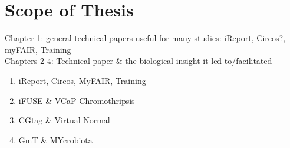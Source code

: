 \chapter*{Scope of Thesis}

Chapter 1: general technical papers useful for many studies: iReport, Circos?, myFAIR, Training \\
Chapters 2-4: Technical paper \& the biological insight it led to/facilitated \\

\begin{enumerate}
    \item iReport, Circos, MyFAIR, Training
    \item iFUSE \& VCaP Chromothripsis
    \item CGtag \& Virtual Normal
    \item GmT \& MYcrobiota
\end{enumerate}
